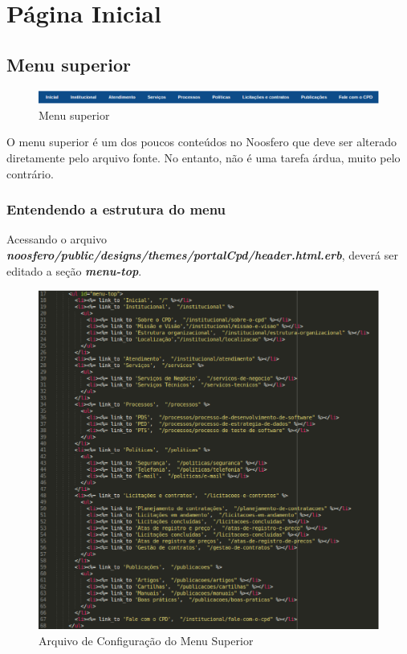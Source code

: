 \chapter{Página Inicial}
\label{chap:paginaInicial}


\section{Menu superior}
\begin{figure}[h]
     \centering
       \includegraphics[keepaspectratio=true,scale=0.49]{figuras/menu_superior}
     \caption{Menu superior}
\end{figure}

O menu superior é um dos poucos conteúdos no Noosfero que deve ser alterado 
diretamente pelo arquivo fonte. No entanto, não é uma tarefa árdua, muito pelo
contrário.

\subsection{Entendendo a estrutura do menu}

Acessando o arquivo \emph{\textbf{noosfero/public/designs/themes/portalCpd/header.html.erb}},
deverá ser editado a seção \emph {\textbf{menu-top}}.

\begin{figure}[h]
     \centering
       \includegraphics[scale=0.5]{figuras/menu-top}
     \caption{Arquivo de Configuração do Menu Superior}
\end{figure}


